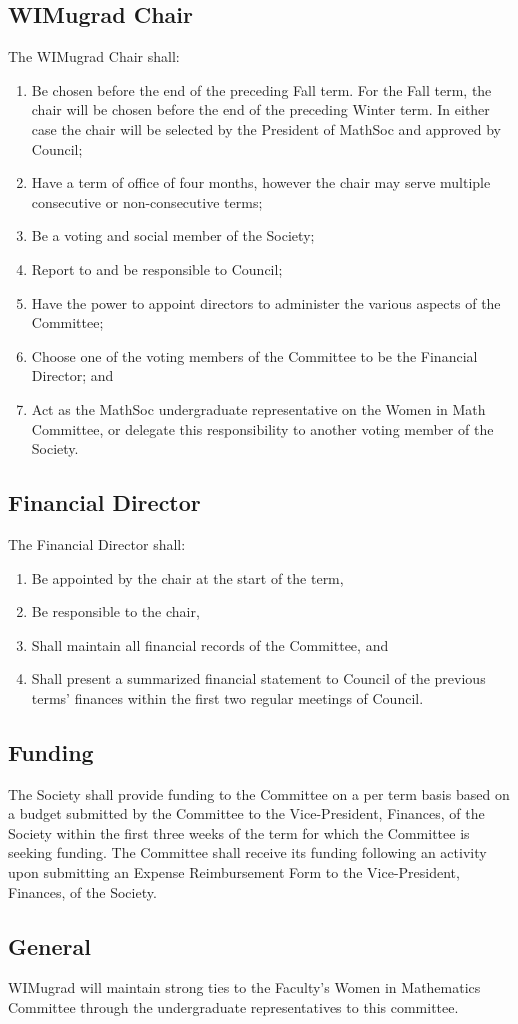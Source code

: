 \subsection{WIMugrad Chair}
The WIMugrad Chair shall:
\begin{enumerate}
\item Be chosen before the end of the preceding Fall term. For the Fall term, the chair will be chosen before the end of the preceding Winter term. In either case the chair will be selected by the President of MathSoc and approved by Council;
\item Have a term of office of four months, however the chair may serve multiple consecutive or non-consecutive terms;
\item Be a voting and social member of the Society;
\item Report to and be responsible to Council;
\item Have the power to appoint directors to administer the various aspects of the Committee;
\item Choose one of the voting members of the Committee to be the Financial Director; and
\item Act as the MathSoc undergraduate representative on the Women in Math Committee, or delegate this responsibility to another voting member of the Society.
\end{enumerate}

\subsection{Financial Director}
The Financial Director shall:
\begin{enumerate}
\item Be appointed by the chair at the start of the term,
\item Be responsible to the chair,
\item Shall maintain all financial records of the Committee, and
\item Shall present a summarized financial statement to Council of the previous terms' finances within the first two regular meetings of Council.
\end{enumerate}

\subsection{Funding}
The Society shall provide funding to the Committee on a per term basis based on a budget submitted by the Committee to the Vice-President, Finances, of the Society within the first three weeks of the term for which the Committee is seeking funding.
The Committee shall receive its funding following an activity upon submitting an Expense Reimbursement Form to the Vice-President, Finances, of the Society.

\subsection{General}
WIMugrad will maintain strong ties to the Faculty's Women in Mathematics Committee through the undergraduate representatives to this committee.